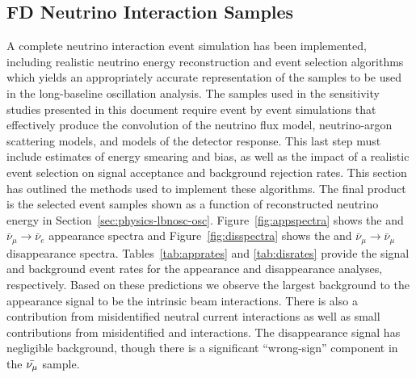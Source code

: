 \subsection{FD Neutrino Interaction Samples}

A complete neutrino interaction event simulation has been implemented, including realistic neutrino energy reconstruction and event selection algorithms which yields an appropriately accurate representation of the  samples to be used in the long-baseline oscillation analysis. The samples used in the sensitivity studies presented in this document require event by event simulations that effectively produce the convolution of the neutrino flux model, neutrino-argon scattering models, and models of the detector response. This last step must include estimates of energy smearing and bias, as well as the impact of a realistic event selection on signal acceptance and background rejection rates. This section has outlined the methods used to implement these algorithms. The final product is the  selected  event samples shown as a function of reconstructed neutrino energy in Section~\ref{sec:physics-lbnosc-osc}. Figure~\ref{fig:appspectra} shows the \numutonue and $\bar{\nu}_\mu \to \bar{\nu}_e$ appearance spectra and Figure~\ref{fig:disspectra} shows the \numutonumu and  $\bar{\nu}_\mu \to \bar{\nu}_\mu$ disappearance spectra. Tables~\ref{tab:apprates} and \ref{tab:disrates} provide the signal and background event rates for the appearance and disappearance analyses, respectively. Based on these predictions we observe the largest background to the \nue {} appearance signal to be the intrinsic beam \nue interactions. There is also a contribution from misidentified neutral current interactions as well as small contributions from misidentified \numu and \nutau interactions. The \numu disappearance signal has negligible background, though there is a significant ``wrong-sign''  \numu component in the $\bar{\nu_\mu}$ sample. %

